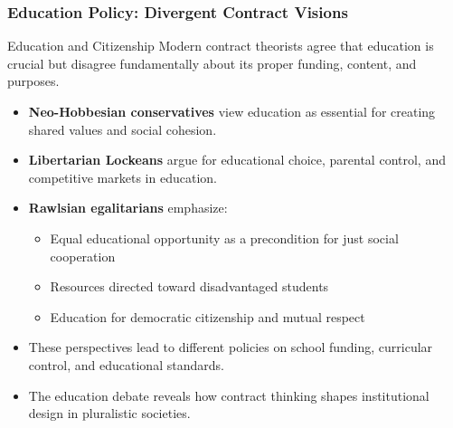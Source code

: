 \documentclass[aspectratio=169]{beamer}
\begin{document}
\begin{frame}
  \frametitle{Education Policy: Divergent Contract Visions}
  
  \begin{alertblock}{Education and Citizenship}
    Modern contract theorists agree that education is crucial but disagree fundamentally about its proper funding, content, and purposes.
  \end{alertblock}
  
  \begin{itemize}
    \item \textbf{Neo-Hobbesian conservatives} view education as essential for creating shared values and social cohesion.
    \item \textbf{Libertarian Lockeans} argue for educational choice, parental control, and competitive markets in education.
    \item \textbf{Rawlsian egalitarians} emphasize:
      \begin{itemize}
        \item Equal educational opportunity as a precondition for just social cooperation
        \item Resources directed toward disadvantaged students
        \item Education for democratic citizenship and mutual respect
      \end{itemize}
    \item These perspectives lead to different policies on school funding, curricular control, and educational standards.
    \item The education debate reveals how contract thinking shapes institutional design in pluralistic societies.
  \end{itemize}
\end{frame}
\end{document}
